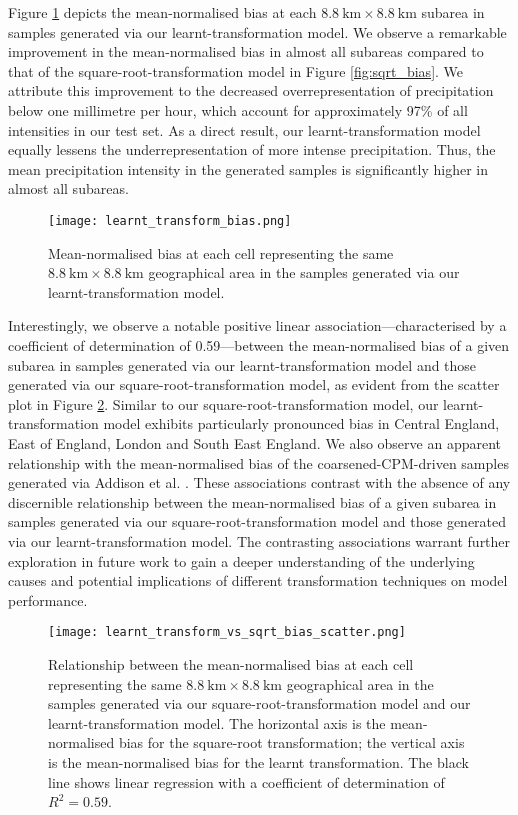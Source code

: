 \documentclass[ oneside,%
                    author={George Herbert},
                    degree={MSci},
                     title={Diffusion Models for Time-Evolving Precipitation Fields},
                  subtitle={}]{dissertation}
\begin{document}
Figure \ref{fig:learnt_transform_bias} depicts the mean-normalised bias at each $8.8\ \mathrm{km}\times 8.8\ \mathrm{km}$ subarea in samples generated via our learnt-transformation model. We observe a remarkable improvement in the mean-normalised bias in almost all subareas compared to that of the square-root-transformation model in Figure \ref{fig:sqrt_bias}. We attribute this improvement to the decreased overrepresentation of precipitation below one millimetre per hour, which account for approximately 97\% of all intensities in our test set. As a direct result, our learnt-transformation model equally lessens the underrepresentation of more intense precipitation. Thus, the mean precipitation intensity in the generated samples is significantly higher in almost all subareas. 

\begin{figure}[htbp]
      \centering
      \texttt{[image: learnt\_transform\_bias.png]}
      \caption{Mean-normalised bias at each cell representing the same $8.8\ \mathrm{km}\times 8.8\ \mathrm{km}$ geographical area in the samples generated via our learnt-transformation model.}
      \label{fig:learnt_transform_bias}
\end{figure}

Interestingly, we observe a notable positive linear association---characterised by a coefficient of determination of 0.59---between the mean-normalised bias of a given subarea in samples generated via our learnt-transformation model and those generated via our square-root-transformation model, as evident from the scatter plot in Figure \ref{fig:learnt_transform_vs_sqrt_bias_scatter}. Similar to our square-root-transformation model, our learnt-transformation model exhibits particularly pronounced bias in Central England, East of England, London and South East England. We also observe an apparent relationship with the mean-normalised bias of the coarsened-CPM-driven samples generated via Addison et al. \cite{Addison_Machine_Learning_Emulation}. These associations contrast with the absence of any discernible relationship between the mean-normalised bias of a given subarea in samples generated via our square-root-transformation model and those generated via our learnt-transformation model. The contrasting associations warrant further exploration in future work to gain a deeper understanding of the underlying causes and potential implications of different transformation techniques on model performance.

\begin{figure}[htbp]
      \centering
      \texttt{[image: learnt\_transform\_vs\_sqrt\_bias\_scatter.png]}
      \caption{Relationship between the mean-normalised bias at each cell representing the same $8.8\ \mathrm{km}\times 8.8\ \mathrm{km}$ geographical area in the samples generated via our square-root-transformation model and our learnt-transformation model. The horizontal axis is the mean-normalised bias for the square-root transformation; the vertical axis is the mean-normalised bias for the learnt transformation. The black line shows linear regression with a coefficient of determination of $R^2 = 0.59$.}
      \label{fig:learnt_transform_vs_sqrt_bias_scatter}
\end{figure}
\end{document}
